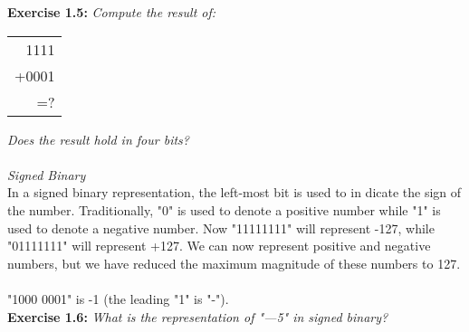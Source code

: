 \documentclass[12pt]{book}
\begin{document}
\noindent\textbf{Exercise 1.5:} \textit{Compute the result of:}
\begin{table}[H]
\begin{center}
\begin{tabular}{r}
1111  \\
+0001 \\ \hline
=?   
\end{tabular}
\end{center}
\end{table}
\noindent\textit{Does the result hold in four bits?}\\
\\

\noindent\textit{Signed Binary}\\

In a signed binary representation, the left-most bit is used to in dicate the sign of the number. Traditionally, "0" is used to denote a positive number while "1" is used to denote a negative number. Now "11111111" will represent -127, while "01111111" will represent +127. We can now represent positive and negative numbers, but we have reduced the maximum magnitude of these numbers to 127.\\

\\
"1000 0001" is -1 (the leading "1" is "-").\\

\noindent\textbf{Exercise 1.6:} \textit{What is the representation of "—5" in signed binary?}\\
\end{document}
